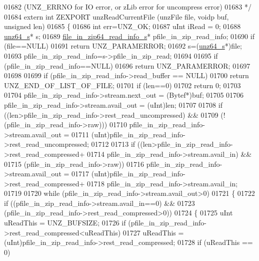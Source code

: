 \begin{DoxyCode}
01682 \textcolor{comment}{    (UNZ\_ERRNO for IO error, or zLib error for uncompress error)}
01683 \textcolor{comment}{*/}
01684 \textcolor{keyword}{extern} \textcolor{keywordtype}{int} ZEXPORT unzReadCurrentFile  (unzFile file, voidp buf, \textcolor{keywordtype}{unsigned} len)
01685 \{
01686     \textcolor{keywordtype}{int} err=UNZ\_OK;
01687     uInt iRead = 0;
01688     \hyperlink{structunz64__s}{unz64\_s}* s;
01689     \hyperlink{structfile__in__zip64__read__info__s}{file\_in\_zip64\_read\_info\_s}* pfile\_in\_zip\_read\_info;
01690     \textcolor{keywordflow}{if} (file==NULL)
01691         \textcolor{keywordflow}{return} UNZ\_PARAMERROR;
01692     s=(\hyperlink{structunz64__s}{unz64\_s}*)file;
01693     pfile\_in\_zip\_read\_info=s->pfile\_in\_zip\_read;
01694 
01695     \textcolor{keywordflow}{if} (pfile\_in\_zip\_read\_info==NULL)
01696         \textcolor{keywordflow}{return} UNZ\_PARAMERROR;
01697 
01698 
01699     \textcolor{keywordflow}{if} (pfile\_in\_zip\_read\_info->read\_buffer == NULL)
01700         \textcolor{keywordflow}{return} UNZ\_END\_OF\_LIST\_OF\_FILE;
01701     \textcolor{keywordflow}{if} (len==0)
01702         \textcolor{keywordflow}{return} 0;
01703 
01704     pfile\_in\_zip\_read\_info->stream.next\_out = (Bytef*)buf;
01705 
01706     pfile\_in\_zip\_read\_info->stream.avail\_out = (uInt)len;
01707 
01708     \textcolor{keywordflow}{if} ((len>pfile\_in\_zip\_read\_info->rest\_read\_uncompressed) &&
01709         (!(pfile\_in\_zip\_read\_info->raw)))
01710         pfile\_in\_zip\_read\_info->stream.avail\_out =
01711             (uInt)pfile\_in\_zip\_read\_info->rest\_read\_uncompressed;
01712 
01713     \textcolor{keywordflow}{if} ((len>pfile\_in\_zip\_read\_info->rest\_read\_compressed+
01714            pfile\_in\_zip\_read\_info->stream.avail\_in) &&
01715          (pfile\_in\_zip\_read\_info->raw))
01716         pfile\_in\_zip\_read\_info->stream.avail\_out =
01717             (uInt)pfile\_in\_zip\_read\_info->rest\_read\_compressed+
01718             pfile\_in\_zip\_read\_info->stream.avail\_in;
01719 
01720     while (pfile\_in\_zip\_read\_info->stream.avail\_out>0)
01721     \{
01722         \textcolor{keywordflow}{if} ((pfile\_in\_zip\_read\_info->stream.avail\_in==0) &&
01723             (pfile\_in\_zip\_read\_info->rest\_read\_compressed>0))
01724         \{
01725             uInt uReadThis = UNZ\_BUFSIZE;
01726             \textcolor{keywordflow}{if} (pfile\_in\_zip\_read\_info->rest\_read\_compressed<uReadThis)
01727                 uReadThis = (uInt)pfile\_in\_zip\_read\_info->rest\_read\_compressed;
01728             if (uReadThis == 0)

\end{DoxyCode}
